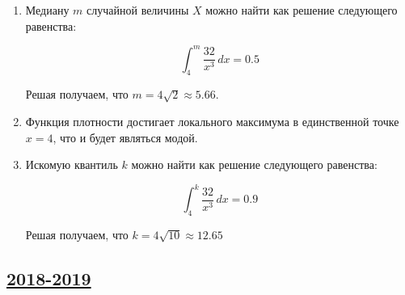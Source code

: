 \begin{enumerate}
\begin{enumerate}
	\item Медиану $m$ случайной величины $X$ можно найти как решение следующего равенства:
	
	\[
	\int_{4}^{m} \frac{32}{x^3} \, dx=0.5
	\]
	
	Решая получаем, что $m=4\sqrt{2}\approx 5.66$.
	
	\item Функция плотности достигает локального максимума в единственной точке $x=4$, что и будет являться модой.
	
	\item Искомую квантиль $k$ можно найти как решение следующего равенства:
	
	\[
	\int_{4}^{k} \frac{32}{x^3} \, dx=0.9
	\]
	
	Решая получаем, что $k=4\sqrt{10}\approx 12.65$
	
	\end{enumerate}
	\end{enumerate}
	
	

\subsection[2018-2019]{\hyperref[sec:kr_01_2018_2019]{2018-2019}}
\label{sec:sol_kr_01_2018_2019}

